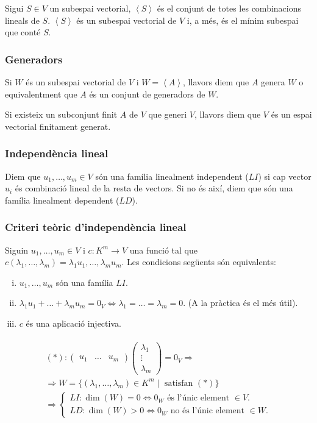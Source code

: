 Sigui $S \in V$ un subespai vectorial, $\left< S \right>$ és el conjunt de totes les combinacions lineals de $S$. $\left< S \right>$ és un subespai vectorial de $V$ i, a més, és el mínim subespai que conté $S$.

\subsubsection*{Generadors}
Si $W$ és un subespai vectorial de $V$ i $W = \left< A \right>$, llavors diem que $A$ genera $W$ o equivalentment que $A$ és un conjunt de generadors de $W$.

Si existeix un subconjunt finit $A$ de $V$ que generi $V$, llavors diem que $V$ és un espai vectorial finitament generat. 

\subsubsection*{Independència lineal}
Diem que $u_{1}, \dots , u_{m} \in V$ són una família linealment independent ($LI$) si cap vector $u_{i}$ és combinació lineal de la resta de vectors. Si no és així, diem que són una família linealment dependent ($LD$).

\subsubsection*{Criteri teòric d'independència lineal}
Siguin $u_{1}, \dots , u_{m} \in V$ i $c: K^{m} \to V$ una funció tal que $c (\lambda _{1}, \dots , \lambda _{m}) = \lambda _{1} u_{1}, \dots , \lambda _{m} u_{m}$. Les condicions següents són equivalents:
\begin{enumerate}[i)]
    \item $u_{1}, \dots , u_{m}$ són una família $LI$.
    \item $\lambda _{1} u_{1} + \dots + \lambda _{m} u_{m} = 0_{V} \Leftrightarrow \lambda _{1} = \dots = \lambda _{m} = 0$. (A la pràctica és el més útil).
    \item $c$ és una aplicació injectiva.
\end{enumerate}
\begin{align}
\begin{gathered}
    (\ast): \begin{pmatrix} u_{1} & \dots & u_{m} \end{pmatrix} \begin{pmatrix} \lambda_{1} \\ \vdots \\ \lambda_{m} \end{pmatrix} = 0_{V} \Rightarrow \\
    \Rightarrow W = \{ (\lambda _{1}, \dots , \lambda_{m}) \in K^{m} \mid \text{ satisfan } (\ast) \} \\
        \Rightarrow \begin{cases} LI: \dim{(W)} = 0 \Leftrightarrow 0_{W} \text{ és l'únic element } \in V. \\ LD: \dim{(W)} > 0 \Leftrightarrow 0_{W} \text{ no és l'únic element } \in W. \end{cases}
\end{gathered}
\end{align}

